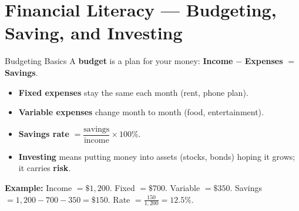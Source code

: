 \section{Financial Literacy --- Budgeting, Saving, and Investing}

\begin{quickReview}{Budgeting Basics}
A \textbf{budget} is a plan for your money: \textbf{Income} $-$ \textbf{Expenses} $=$ \textbf{Savings}.

\begin{itemize}[leftmargin=*]
    \item \textbf{Fixed expenses} stay the same each month (rent, phone plan).
    \item \textbf{Variable expenses} change month to month (food, entertainment).
    \item \textbf{Savings rate} $= \dfrac{\text{savings}}{\text{income}} \times 100\%$.
    \item \textbf{Investing} means putting money into assets (stocks, bonds) hoping it grows; it carries \textbf{risk}.
\end{itemize}

\medskip
\textbf{Example:} Income $= \$1{,}200$. Fixed $= \$700$. Variable $= \$350$. Savings $= 1{,}200 - 700 - 350 = \$150$. Rate $= \frac{150}{1{,}200} = 12.5\%$.
\end{quickReview}

